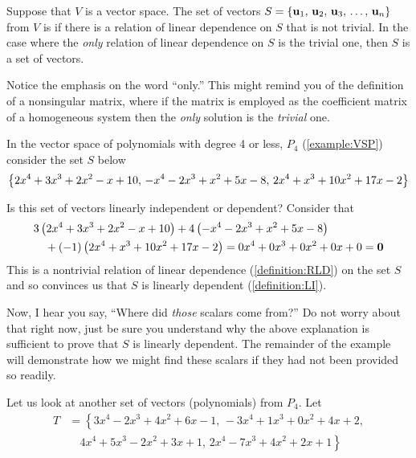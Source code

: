 \documentclass{ximera}
\begin{document}
\begin{definition}
  Suppose that $V$ is a vector space.  The set of vectors
  $S=\left\{\mathbf{u}_{1},\,\mathbf{u}_{2},\,\mathbf{u}_{3},\,\ldots,\,\mathbf{u}_{n}\right\}$ from $V$ is  if
  there is a relation of linear dependence on $S$ that is not trivial.
  In the case where the \textit{only} relation of linear dependence on
  $S$ is the trivial one, then $S$ is a  set
  of vectors.
\end{definition}

Notice the emphasis on the word ``only.''  This might remind you of
the definition of a nonsingular matrix, where if the matrix is
employed as the coefficient matrix of a homogeneous system then the
\textit{only} solution is the \textit{trivial} one.

\begin{example}
  In the vector space of polynomials with degree 4 or less, $P_4$
  (\ref{example:VSP}) consider the set $S$ below
  \begin{align*}
    \left\{
    2x^4+3x^3+2x^2-x+10,\,
    -x^4-2x^3+x^2+5x-8,\,
    2x^4+x^3+10x^2+17x-2
    \right\}
  \end{align*}
  
  Is this set of vectors linearly independent or dependent?  Consider
  that
  \begin{align*}
    &3\left(2x^4+3x^3+2x^2-x+10\right)
      +4\left(-x^4-2x^3+x^2+5x-8\right)\\
    &\quad +(-1)\left(2x^4+x^3+10x^2+17x-2\right)
      =0x^4+0x^3+0x^2+0x+0=\mathbf{0}
  \end{align*}
  This is a nontrivial relation of linear dependence
  (\ref{definition:RLD}) on the set $S$ and so convinces us that $S$
  is linearly dependent (\ref{definition:LI}).

  Now, I hear you say, ``Where did \textit{those} scalars come from?''
  Do not worry about that right now, just be sure you understand why
  the above explanation is sufficient to prove that $S$ is linearly
  dependent.  The remainder of the example will demonstrate how we
  might find these scalars if they had not been provided so readily.

  Let us look at another set of vectors (polynomials) from $P_4$.  Let
  \begin{align*}
    T&=\left\{
       3x^4-2x^3+4x^2+6x-1,\,
       -3x^4+1x^3+0x^2+4x+2,\right.\\
     &\quad \left.4x^4+5x^3-2x^2+3x+1,\,
       2x^4-7x^3+4x^2+2x+1\right\}
  \end{align*}


\end{example}
\end{document}
